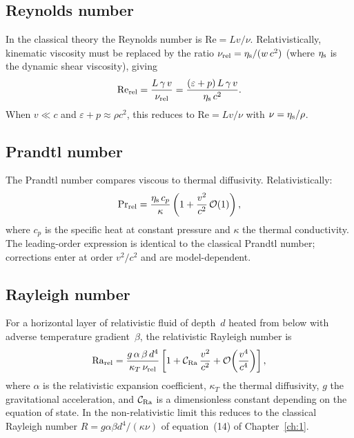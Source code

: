 \subsection{Reynolds number}

In the classical theory the Reynolds number is
$\mathrm{Re}=Lv/\nu$.  Relativistically, kinematic viscosity must be
replaced by the ratio $\nu_{\rm rel}=\eta_{\rm s}/(w\,c^{2})$
(where $\eta_{\rm s}$ is the dynamic shear viscosity), giving
\begin{equation}
\label{eq:rel-1-19}
\mathrm{Re}_{\rm rel}
  = \frac{L\,\gamma\,v}{\nu_{\rm rel}}
  = \frac{(\varepsilon+p)\,L\,\gamma\,v}{\eta_{\rm s}\,c^{2}}.
\end{equation}
When $v\ll c$ and $\varepsilon+p\approx\rho c^{2}$, this reduces to
$\mathrm{Re}=Lv/\nu$ with $\nu=\eta_{\rm s}/\rho$.

\subsection{Prandtl number}

The Prandtl number compares viscous to thermal diffusivity.
Relativistically:
\begin{equation}
\label{eq:rel-1-20}
\mathrm{Pr}_{\rm rel}
  = \frac{\eta_{\rm s}\,c_{p}}{\kappa}
  \left(1 + \frac{v^{2}}{c^{2}}\,\mathcal{O}(1)\right),
\end{equation}
where $c_{p}$ is the specific heat at constant pressure and $\kappa$
the thermal conductivity.  The leading-order expression is identical
to the classical Prandtl number; corrections enter at order
$v^{2}/c^{2}$ and are model-dependent.

\subsection{Rayleigh number}

For a horizontal layer of relativistic fluid of depth~$d$ heated from
below with adverse temperature gradient~$\beta$, the relativistic
Rayleigh number is
\begin{equation}
\label{eq:rel-1-21}
\mathrm{Ra}_{\rm rel}
  = \frac{g\,\alpha\,\beta\,d^{4}}{\kappa_{T}\,\nu_{\rm rel}}
  \left[
    1 + \mathcal{C}_{\rm Ra}\,\frac{v^{2}}{c^{2}}
    + \mathcal{O}\!\left(\frac{v^{4}}{c^{4}}\right)
  \right],
\end{equation}
where $\alpha$ is the relativistic expansion coefficient,
$\kappa_{T}$ the thermal diffusivity, $g$ the gravitational
acceleration, and $\mathcal{C}_{\rm Ra}$ is a dimensionless constant
depending on the equation of state.  In the non-relativistic limit
this reduces to the classical Rayleigh number
$R=g\alpha\beta d^{4}/(\kappa\nu)$ of equation~(14) of
Chapter~\ref{ch:1}.

